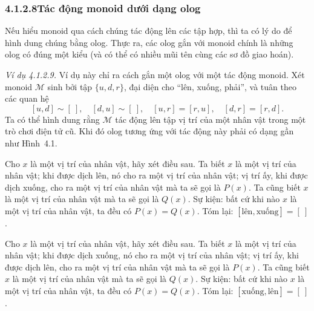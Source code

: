\subsubsection*{4.1.2.8\quad Tác động monoid dưới dạng olog}

Nếu hiểu monoid qua cách chúng tác động lên các tập hợp, thì ta có lý do để hình dung chúng bằng olog. Thực ra, các olog gắn với monoid chính là những olog có đúng một kiểu (và có thể có nhiều mũi tên cùng các sơ đồ giao hoán).

\noindent\textit{Ví dụ 4.1.2.9.} Ví dụ này chỉ ra cách gắn một olog với một tác động monoid. Xét monoid $\mathcal{M}$ sinh bởi tập $\{u,d,r\}$, đại diện cho ``lên, xuống, phải'', và tuân theo các quan hệ
\[
[u,d]\sim[\ ],\quad[d,u]\sim[\ ],\quad[u,r]=[r,u],\quad[d,r]=[r,d].
\]
Ta có thể hình dung rằng $\mathcal{M}$ tác động lên tập vị trí của một nhân vật trong một trò chơi điện tử cũ. Khi đó olog tương ứng với tác động này phải có dạng gần như Hình~4.1.

\begin{figure}[htbp]
\centering
{}
\caption{}
\label{fig:monoid-action-olog}
\end{figure}
Cho $x$ là một vị trí của nhân vật, hãy xét điều sau. Ta biết $x$ là một vị trí của nhân vật; khi được dịch lên, nó cho ra một vị trí của nhân vật; vị trí ấy, khi được dịch xuống, cho ra một vị trí của nhân vật mà ta sẽ gọi là $P(x)$. Ta cũng biết $x$ là một vị trí của nhân vật mà ta sẽ gọi là $Q(x)$. Sự kiện: bất cứ khi nào $x$ là một vị trí của nhân vật, ta đều có $P(x)=Q(x)$. Tóm lại: $[\text{lên},\text{xuống}]=[\ ]$.

Cho $x$ là một vị trí của nhân vật, hãy xét điều sau. Ta biết $x$ là một vị trí của nhân vật; khi được dịch xuống, nó cho ra một vị trí của nhân vật; vị trí ấy, khi được dịch lên, cho ra một vị trí của nhân vật mà ta sẽ gọi là $P(x)$. Ta cũng biết $x$ là một vị trí của nhân vật mà ta sẽ gọi là $Q(x)$. Sự kiện: bất cứ khi nào $x$ là một vị trí của nhân vật, ta đều có $P(x)=Q(x)$. Tóm lại: $[\text{xuống},\text{lên}]=[\ ]$.

